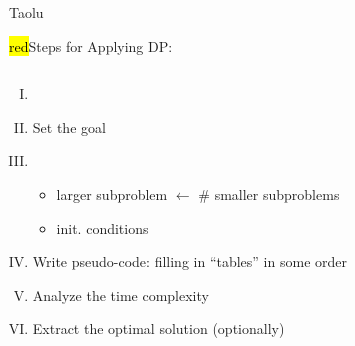 
\begin{frame}{}
  \centerline{\Huge Taolu}
\end{frame}

\begin{frame}{}
  \centerline{\hl{red}{\Large Steps for Applying DP:}}

  \pause
  \vspace{0.30cm}
  \begin{columns}
      \begin{enumerate}[(I)]
	\setlength{\itemsep}{8pt}
	\item {}
	\item Set the goal
	\item {}
	  \begin{itemize}
	    \item larger subproblem $\gets$ \# smaller subproblems
	    \item init. conditions
	  \end{itemize}
	\item Write pseudo-code: filling in ``tables'' in some order
	\item Analyze the time complexity
	\item Extract the optimal solution (optionally)
      \end{enumerate}
  \end{columns}

\end{frame}
